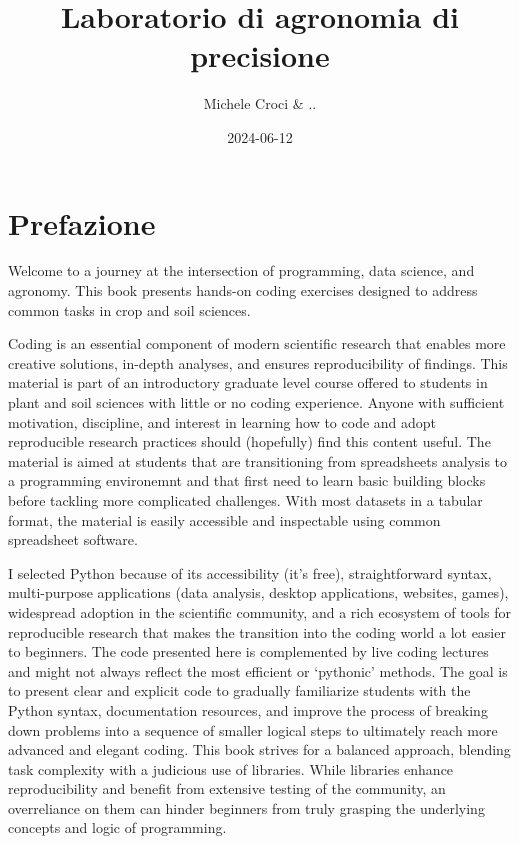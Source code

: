 \documentclass[
]{book}
\title{Laboratorio di agronomia di precisione}
\author{Michele Croci \& ..}
\date{2024-06-12}
\theoremstyle{definition}
\theoremstyle{definition}
\theoremstyle{definition}
\theoremstyle{definition}
\theoremstyle{remark}
\begin{document}
\maketitle

{
\setcounter{tocdepth}{1}
\tableofcontents
}
\hypertarget{prefazione}{%
\chapter{Prefazione}\label{prefazione}}

Welcome to a journey at the intersection of programming, data science, and agronomy. This book presents hands-on coding exercises designed to address common tasks in crop and soil sciences.

Coding is an essential component of modern scientific research that enables more creative solutions, in-depth analyses, and ensures reproducibility of findings. This material is part of an introductory graduate level course offered to students in plant and soil sciences with little or no coding experience. Anyone with sufficient motivation, discipline, and interest in learning how to code and adopt reproducible research practices should (hopefully) find this content useful. The material is aimed at students that are transitioning from spreadsheets analysis to a programming environemnt and that first need to learn basic building blocks before tackling more complicated challenges. With most datasets in a tabular format, the material is easily accessible and inspectable using common spreadsheet software.

I selected Python because of its accessibility (it's free), straightforward syntax, multi-purpose applications (data analysis, desktop applications, websites, games), widespread adoption in the scientific community, and a rich ecosystem of tools for reproducible research that makes the transition into the coding world a lot easier to beginners. The code presented here is complemented by live coding lectures and might not always reflect the most efficient or `pythonic' methods. The goal is to present clear and explicit code to gradually familiarize students with the Python syntax, documentation resources, and improve the process of breaking down problems into a sequence of smaller logical steps to ultimately reach more advanced and elegant coding. This book strives for a balanced approach, blending task complexity with a judicious use of libraries. While libraries enhance reproducibility and benefit from extensive testing of the community, an overreliance on them can hinder beginners from truly grasping the underlying concepts and logic of programming.
\end{document}
